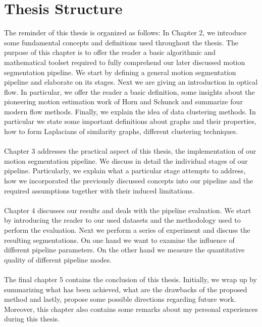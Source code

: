 \section{Thesis Structure}
The reminder of this thesis is organized as follows: In Chapter 2, we introduce some fundamental concepts and definitions used throughout the thesis. The purpose of this chapter is to offer the reader a basic algorithmic and mathematical toolset required to fully comprehend our later discussed motion segmentation pipeline. We start by defining a general motion segmentation pipeline and elaborate on its stages. Next we are giving an introduction in optical flow. In particular, we offer the reader a basic definition, some insights about the pioneering motion estimation work of Horn and Schunck and summarize four modern flow methods. Finally, we explain the idea of data clustering methods. In particular we state some important definitions about graphs and their properties, how to form Laplacians of similarity graphs, different clustering techniques. \\ \\
Chapter 3 addresses the practical aspect of this thesis, the implementation of our motion segmentation pipeline. We discuss in detail the individual stages of our pipeline. Particularly, we explain what a particular stage attempts to address, how we incorporated the previously discussed concepts into our pipeline and the required assumptions together with their induced limitations. \\ \\
Chapter 4 discusses our results and deals with the pipeline evaluation. We start by introducing the reader to our used datasets and the methodology used to perform the evaluation. Next we perform a series of experiment and discuss the resulting segmentations. On one hand we want to examine the influence of different pipeline parameters. On the other hand we measure the quantitative quality of different pipeline modes. \\ \\
The final chapter 5 contains the conclusion of this thesis. Initially, we wrap up by summarizing what has been achieved, what are the drawbacks of the proposed method and lastly, propose some possible directions regarding future work. Moreover, this chapter also contains some remarks about my personal experiences during this thesis. 